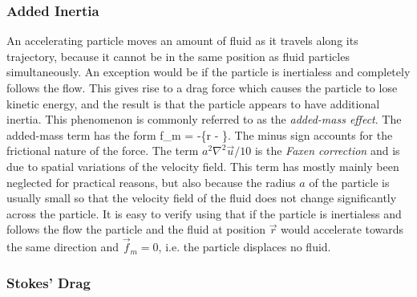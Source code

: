 

\subsubsection{Added Inertia}

An accelerating particle moves an amount of fluid as it travels along its trajectory, because it cannot be in the same position as fluid particles simultaneously. An exception would be if the particle is inertialess and completely follows the flow. This gives rise to a drag force which causes the particle to lose kinetic energy, and the result is that the particle appears to have additional inertia. This phenomenon is commonly referred to as the \emph{added-mass effect}. 
The added-mass term has the form
\beq 
\vec f_m = -\left\{\ddvec r - \right\}.
\eeq
The minus sign accounts for the frictional nature of the force. The term $a^2\nabla^2\vec u / 10$ is the \emph{Faxen correction} and is due to spatial variations of the velocity field. This term has mostly mainly been neglected for practical reasons, but also because the radius $a$ of the particle is usually small so that the velocity field of the fluid does not change significantly across the particle. It is easy to verify using  that if the particle is inertialess and follows the flow the particle and the fluid at position $\vec r$ would accelerate towards the same direction and $\vec f _m  = 0$, i.e. the particle displaces no fluid. 

\subsubsection{Stokes' Drag}

